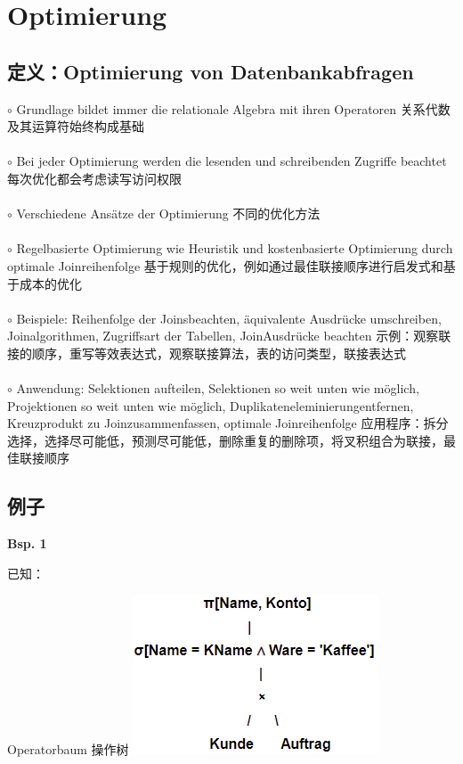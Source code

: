 \documentclass[fleqn]{article}
\begin{document}
\section{Optimierung}

\subsection{定义：Optimierung von Datenbankabfragen}

\noindent $\circ$ Grundlage bildet immer die relationale Algebra mit ihren Operatoren
关系代数及其运算符始终构成基础
\\
\\
$\circ$ Bei jeder Optimierung werden die lesenden und schreibenden Zugriffe beachtet
每次优化都会考虑读写访问权限
\\
\\
$\circ$ Verschiedene Ansätze der Optimierung
不同的优化方法
\\
\\
$\circ$ Regelbasierte Optimierung wie Heuristik und kostenbasierte Optimierung durch optimale Joinreihenfolge
基于规则的优化，例如通过最佳联接顺序进行启发式和基于成本的优化
\\
\\
$\circ$ Beispiele: Reihenfolge der Joinsbeachten, äquivalente Ausdrücke umschreiben, Joinalgorithmen, Zugriffsart der Tabellen, JoinAusdrücke beachten
示例：观察联接的顺序，重写等效表达式，观察联接算法，表的访问类型，联接表达式
\\
\\
$\circ$ Anwendung: Selektionen aufteilen, Selektionen so weit unten wie möglich, Projektionen so weit unten wie möglich, Duplikateneleminierungentfernen, Kreuzprodukt zu Joinzusammenfassen, optimale Joinreihenfolge
应用程序：拆分选择，选择尽可能低，预测尽可能低，删除重复的删除项，将叉积组合为联接，最佳联接顺序

\subsection{例子}

\noindent\textbf{Bsp. 1}

\noindent 已知：

\begin{center}
    Operatorbaum 操作树
    \includegraphics[scale=0.5]{39.png}
\end{center}
\end{document}
